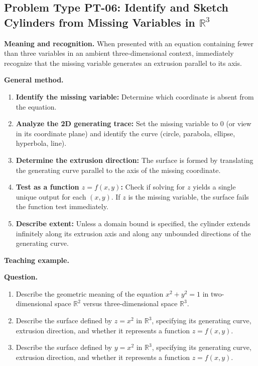 \documentclass[11pt,letterpaper]{article}
\newcommand{\R}{\mathbb{R}}
\begin{document}
\subsection{Problem Type PT-06: Identify and Sketch Cylinders from Missing Variables in $\R^3$}\label{pt:06}

\textbf{Meaning and recognition.} 
When presented with an equation containing fewer than three variables in an ambient three-dimensional context, immediately recognize that the missing variable generates an extrusion parallel to its axis.

\textbf{General method.}
\begin{enumerate}[leftmargin=*,nosep]
    \item \textbf{Identify the missing variable:} Determine which coordinate is absent from the equation.
    \item \textbf{Analyze the 2D generating trace:} Set the missing variable to 0 (or view in its coordinate plane) and identify the curve (circle, parabola, ellipse, hyperbola, line).
    \item \textbf{Determine the extrusion direction:} The surface is formed by translating the generating curve parallel to the axis of the missing coordinate.
    \item \textbf{Test as a function $z=f(x,y)$:} Check if solving for $z$ yields a single unique output for each $(x,y)$. If $z$ is the missing variable, the surface fails the function test immediately.
    \item \textbf{Describe extent:} Unless a domain bound is specified, the cylinder extends infinitely along its extrusion axis and along any unbounded directions of the generating curve.
\end{enumerate}

\textbf{Teaching example.}

\textbf{Question.} 
\begin{enumerate}[label=(\alph*),nosep]
    \item Describe the geometric meaning of the equation $x^2 + y^2 = 1$ in two-dimensional space $\R^2$ versus three-dimensional space $\R^3$.
    \item Describe the surface defined by $z = x^2$ in $\R^3$, specifying its generating curve, extrusion direction, and whether it represents a function $z = f(x,y)$.
    \item Describe the surface defined by $y = x^2$ in $\R^3$, specifying its generating curve, extrusion direction, and whether it represents a function $z = f(x,y)$.
\end{enumerate}
\end{document}
